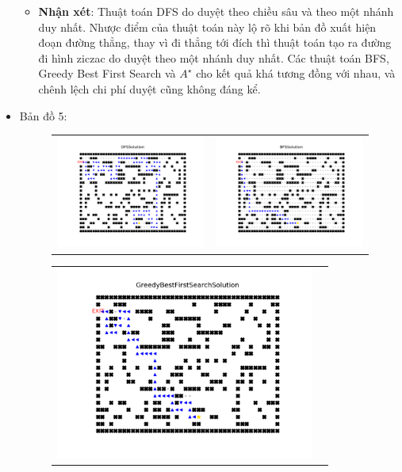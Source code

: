 \documentclass[11pt]{scrartcl} %
\begin{document}
\begin{itemize}
\begin{figure}[h]
\begin{tabular}{cc}
		\end{tabular}
	\end{figure}
	\begin{itemize}
		\item \textbf{Nhận xét}: Thuật toán DFS do duyệt theo chiều sâu và theo một nhánh duy nhất. Nhược điểm của thuật toán này lộ rõ khi bản đồ xuất hiện đoạn đường thẳng, thay vì đi thẳng tới đích thì thuật toán tạo ra đường đi hình ziczac do duyệt theo một nhánh duy nhất. Các thuật toán BFS, Greedy Best First Search và $A^{\star}$ cho kết quả khá tương đồng với nhau, và chênh lệch chi phí duyệt cũng không đáng kể.
	\end{itemize}

		\newpage
	\item Bản đồ 5:
	\begin{figure}[h] \label{bd5}
		\centering
		\begin{tabular}{cc}
			\includegraphics[width=8.5cm]{Figures/fg5_dfs.png} &
			\includegraphics[width=8.5cm]{Figures/fg5_bfs.png} \\
		\end{tabular}
	\end{figure}
	\begin{figure}[h] \label{Hình 5}
		\centering
		\begin{tabular}{cc}
			\includegraphics[width=8.5cm]{Figures/fg5_gbfs.png} &

\end{tabular}
\end{figure}
\end{itemize}
\end{document}
